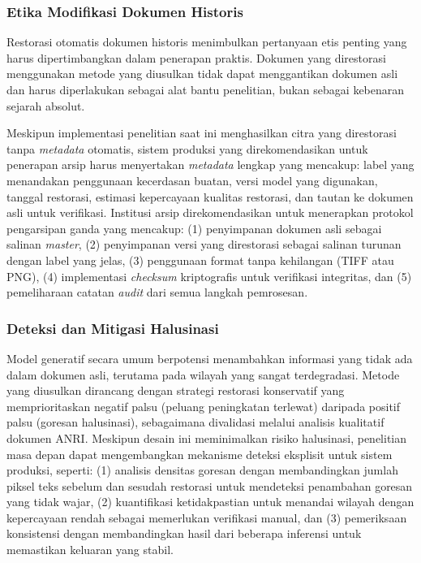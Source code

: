\documentclass[journal]{IEEEtran}
\begin{document}
\subsubsection{Etika Modifikasi Dokumen Historis}

Restorasi otomatis dokumen historis menimbulkan pertanyaan etis penting yang harus dipertimbangkan dalam penerapan praktis. Dokumen yang direstorasi menggunakan metode yang diusulkan tidak dapat menggantikan dokumen asli dan harus diperlakukan sebagai alat bantu penelitian, bukan sebagai kebenaran sejarah absolut.

Meskipun implementasi penelitian saat ini menghasilkan citra yang direstorasi tanpa \textit{metadata} otomatis, sistem produksi yang direkomendasikan untuk penerapan arsip harus menyertakan \textit{metadata} lengkap yang mencakup: label yang menandakan penggunaan kecerdasan buatan, versi model yang digunakan, tanggal restorasi, estimasi kepercayaan kualitas restorasi, dan tautan ke dokumen asli untuk verifikasi. Institusi arsip direkomendasikan untuk menerapkan protokol pengarsipan ganda yang mencakup: (1) penyimpanan dokumen asli sebagai salinan \textit{master}, (2) penyimpanan versi yang direstorasi sebagai salinan turunan dengan label yang jelas, (3) penggunaan format tanpa kehilangan (TIFF atau PNG), (4) implementasi \textit{checksum} kriptografis untuk verifikasi integritas, dan (5) pemeliharaan catatan \textit{audit} dari semua langkah pemrosesan.

\subsubsection{Deteksi dan Mitigasi Halusinasi}

Model generatif secara umum berpotensi menambahkan informasi yang tidak ada dalam dokumen asli, terutama pada wilayah yang sangat terdegradasi. Metode yang diusulkan dirancang dengan strategi restorasi konservatif yang memprioritaskan negatif palsu (peluang peningkatan terlewat) daripada positif palsu (goresan halusinasi), sebagaimana divalidasi melalui analisis kualitatif dokumen ANRI. Meskipun desain ini meminimalkan risiko halusinasi, penelitian masa depan dapat mengembangkan mekanisme deteksi eksplisit untuk sistem produksi, seperti: (1) analisis densitas goresan dengan membandingkan jumlah piksel teks sebelum dan sesudah restorasi untuk mendeteksi penambahan goresan yang tidak wajar, (2) kuantifikasi ketidakpastian untuk menandai wilayah dengan kepercayaan rendah sebagai memerlukan verifikasi manual, dan (3) pemeriksaan konsistensi dengan membandingkan hasil dari beberapa inferensi untuk memastikan keluaran yang stabil.
\end{document}
